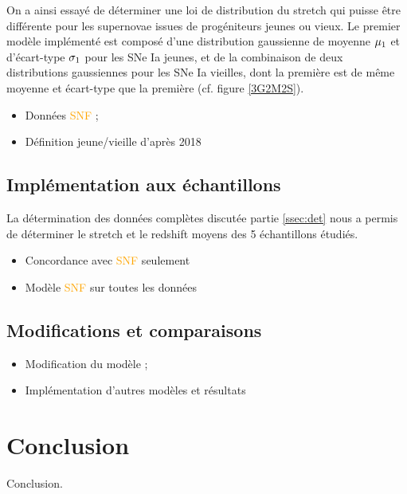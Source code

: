 \documentclass[a4paper, 12pt, svgnames]{article}
\begin{document}
On a ainsi essayé de déterminer une loi de distribution du stretch qui puisse
être différente pour les supernovae issues de progéniteurs jeunes ou vieux. Le
premier modèle implémenté est composé d'une distribution gaussienne de moyenne
$\mu_1$ et d'écart-type $\sigma_1$ pour les SNe Ia jeunes, et de la combinaison de
deux distributions gaussiennes pour les SNe Ia vieilles, dont la première est de
même moyenne et écart-type que la première (cf. figure \ref{3G2M2S}).


\begin{itemize}
    \item Données \textcolor{orange}{SNF} ;
    \item Définition jeune/vieille d'après  2018
\end{itemize}

\subsection{Implémentation aux échantillons}\label{ssec:surveys}
La détermination des données complètes discutée partie \ref{ssec:det} nous a
permis de déterminer le stretch et le redshift moyens des 5 échantillons
étudiés. 
\begin{itemize}
    \item Concordance avec \textcolor{orange}{SNF} seulement
    \item Modèle \textcolor{orange}{SNF} sur toutes les données
\end{itemize}

\subsection{Modifications et comparaisons}
\begin{itemize}
    \item Modification du modèle ;
    \item Implémentation d'autres modèles et résultats
\end{itemize}

\section{Conclusion}
Conclusion.

%


\end{document}
